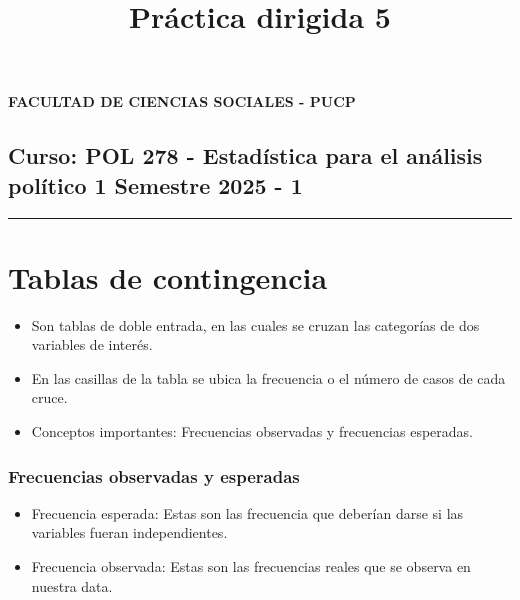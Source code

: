 \documentclass[
]{article}
\title{Práctica dirigida 5}
\author{}
\date{\vspace{-2.5em}}
\providecommand{\tightlist}{%
  \setlength{\itemsep}{0pt}\setlength{\parskip}{0pt}}
\begin{document}
\maketitle

{
\setcounter{tocdepth}{2}
\tableofcontents
}
\textbf{FACULTAD DE CIENCIAS SOCIALES - PUCP}

\hypertarget{curso-pol-278---estaduxedstica-para-el-anuxe1lisis-poluxedtico-1-semestre-2025---1}{%
\subsection{\texorpdfstring{Curso: POL 278 - Estadística para el
análisis político 1 \textbar{} Semestre 2025 - 1
}{Curso: POL 278 - Estadística para el análisis político 1 \textbar{} Semestre 2025 - 1  }}\label{curso-pol-278---estaduxedstica-para-el-anuxe1lisis-poluxedtico-1-semestre-2025---1}}

\begin{center}\rule{0.5\linewidth}{0.5pt}\end{center}

\hypertarget{tablas-de-contingencia}{%
\section{\texorpdfstring{\textbf{Tablas de
contingencia}}{Tablas de contingencia}}\label{tablas-de-contingencia}}

\begin{itemize}
\tightlist
\item
  Son tablas de doble entrada, en las cuales se cruzan las categorías de
  dos variables de interés.
\item
  En las casillas de la tabla se ubica la frecuencia o el número de
  casos de cada cruce.
\item
  Conceptos importantes: Frecuencias observadas y frecuencias esperadas.
\end{itemize}

\hypertarget{frecuencias-observadas-y-esperadas}{%
\subsubsection{\texorpdfstring{\textbf{Frecuencias observadas y
esperadas}}{Frecuencias observadas y esperadas}}\label{frecuencias-observadas-y-esperadas}}

\begin{itemize}
\item
  Frecuencia esperada: Estas son las frecuencia que deberían darse si
  las variables fueran independientes.
\item
  Frecuencia observada: Estas son las frecuencias reales que se observa
  en nuestra data.
\end{itemize}
\end{document}

